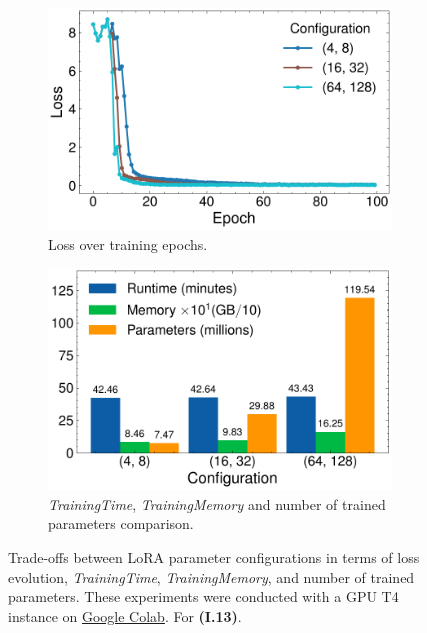 \documentclass{article}
\begin{document}
\begin{figure}[h]
    \centering
    \begin{subfigure}{0.45\textwidth}
        \includegraphics[width=0.9\linewidth]{../images/I.14 Results_loss.pdf}
        \caption{Loss over training epochs. \vspace{3.5mm}}
    \end{subfigure}
    \hfill
    \begin{subfigure}{0.45\textwidth}
        \includegraphics[width=0.9\linewidth]{../images/I.14 Results_metrics.pdf}
        \caption{\emph{TrainingTime}, \emph{TrainingMemory} and number of trained parameters comparison.}
    \end{subfigure}
    \caption{Trade-offs between LoRA parameter configurations in terms of loss evolution, \emph{TrainingTime}, \emph{TrainingMemory}, and number of trained parameters. These experiments were conducted with a GPU T4 instance on \href{https://colab.research.google.com/}{Google Colab}. For \textbf{(I.13)}.}
    \label{fig:I13-results-plots}
\end{figure}
\end{document}
